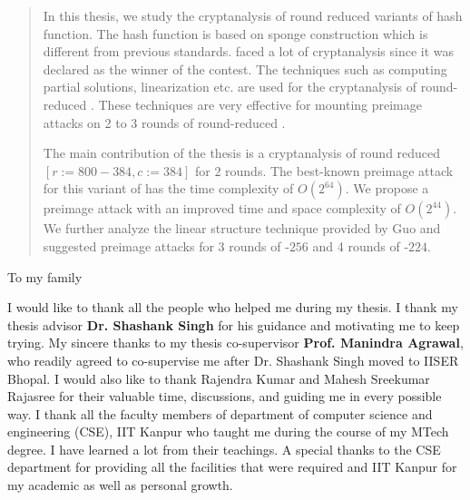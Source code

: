 \begin{abstract}
	
In this thesis, we study the cryptanalysis of round reduced variants of
\KECCAK{} hash function. The \KECCAK{} hash function is based on sponge
construction which is different from previous \SHA{} standards. 
\KECCAK{} faced a lot of cryptanalysis since it was declared as the
winner of the  contest. The techniques such as computing partial
solutions,  linearization etc. are used for the cryptanalysis of
round-reduced \KECCAK{}. These techniques are very effective for
mounting preimage attacks on 2 to 3 rounds of round-reduced \KECCAK{}. 

The main contribution of the thesis is a cryptanalysis of round reduced
\KECCAK{}$[r:=800-384, c:=384]$ for $2$ rounds. The best-known preimage
attack for this variant of \KECCAK{} has the time complexity of
 $O(2^{64})$. We propose a preimage attack with an improved time and
space complexity of $O(2^{44})$. We further analyze the linear structure
technique provided by Guo \etal and suggested preimage attacks for 3 rounds of \KECCAK-$256$ and 4 rounds of \KECCAK-$224$.
\end{abstract}

\begin{dedication}
To my family
\end{dedication}

\begin{acknowledgments}

I would like to thank all the people who helped me during my thesis. I thank my thesis advisor \textbf{Dr. Shashank Singh} for his guidance and motivating me to keep trying.
My sincere thanks to my thesis co-supervisor \textbf{Prof. Manindra Agrawal}, who readily agreed to co-supervise me after Dr. Shashank Singh moved to IISER Bhopal. 
% 
% 
 I would also like to thank Rajendra Kumar and Mahesh Sreekumar Rajasree
  for their valuable time, discussions, and guiding me in every possible
  way. I thank all the faculty members of department of computer science
  and engineering (CSE), IIT Kanpur who taught me during the course of my
  MTech degree. I have learned a lot from their teachings. A special
  thanks to the CSE department for providing all the facilities that were required and  IIT Kanpur for my academic as well as personal growth.
\end{acknowledgments}

\tableofcontents
\listoftables

\cleardoublepage
{} \label{listoffig}
\listoffigures

\cleardoublepage{} %
